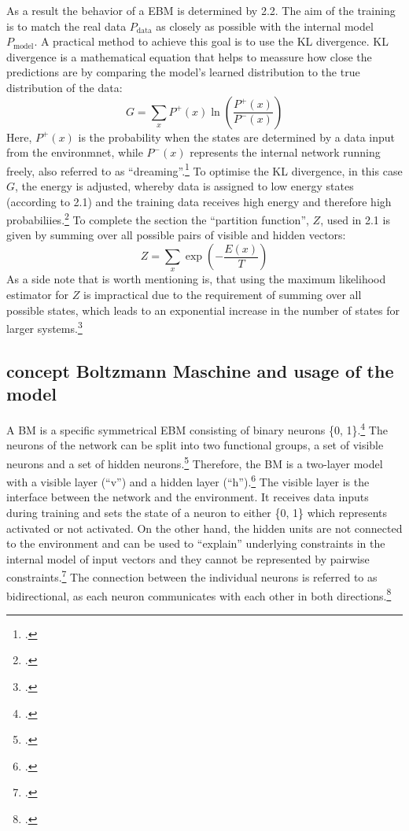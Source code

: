 As a result the behavior of a \ac{EBM} is determined by 2.2. 
The aim of the training is to match the real data \( P_{\text{data}} \) as closely as possible with the internal model \( P_{\text{model}} \).
A practical method to achieve this goal is to use the KL divergence. KL divergence is a mathematical equation that helps to meassure how close the predictions are by comparing the model's learned distribution to the true distribution of the data:
\begin{equation}
    G = \sum_x P^+(x) \ln \left( \frac{P^+(x)}{P^-(x)} \right)
\end{equation}
Here, \(P^+(x)\) is the probability when the states are determined by a data input from the environmnet, while \(P^-(x)\) represents the internal network running freely, also referred to as ``dreaming''.\footcite[Vgl.][154-155]{ackleyLearningAlgorithmBoltzmann1985}
To optimise the KL divergence, in this case \( G \), the energy is adjusted, whereby data is assigned to low energy states (according to 2.1) and the training data receives high energy and therefore high probabiliies.\footcite[Vgl.][2-3]{zhaiDeepStructuredEnergy2016}
To complete the section the ``partition function'', \( Z \), used in 2.1 is given by summing over all possible pairs of visible and hidden vectors:
\begin{equation}
    Z = \sum_x \exp\left(-\frac{E(x)}{T}\right)
\end{equation}
As a side note that is worth mentioning is, that using the maximum likelihood estimator for \( Z \) is impractical due to the requirement of summing over all possible states, which leads to an exponential increase in the number of states for larger systems.\footcite[Vgl.][2-3]{zhaiDeepStructuredEnergy2016}

\subsection{concept Boltzmann Maschine and usage of the model}

A \ac{BM} is a specific symmetrical \ac{EBM} consisting of binary neurons \{0, 1\}.\footcite[Vgl.][260]{amariInformationGeometryBoltzmann1992}
The neurons of the network can be split into two functional groups, a set of visible neurons and a set of hidden neurons.\footcite[Vgl.][154]{ackleyLearningAlgorithmBoltzmann1985}
Therefore, the \ac{BM} is a two-layer model with a visible layer (``v'') and a hidden layer (``h'').\footcite[Vgl.][448]{salakhutdinovDeepBoltzmannMachines2009}
The visible layer is the interface between the network and the environment. It receives data inputs during training and sets the state of a neuron to either \{0, 1\} which represents activated or not activated.
On the other hand, the hidden units are not connected to the environment and can be used to “explain” underlying constraints in the internal model of input vectors and they cannot be represented by pairwise constraints.\footcite[Vgl.][154]{ackleyLearningAlgorithmBoltzmann1985}
The connection between the individual neurons is referred to as bidirectional, as each neuron communicates with each other in both directions.\footcite[Vgl.][149]{ackleyLearningAlgorithmBoltzmann1985}

